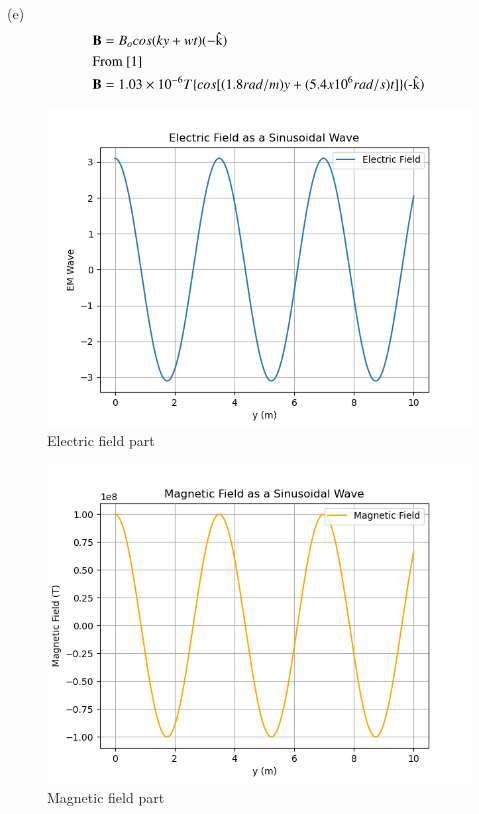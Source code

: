 \documentclass[journal,12pt,twocolumn]{IEEEtran}
\theoremstyle{remark}
\begin{document}
(e)
\begin{align}
	&\textbf{B}=B_ocos(ky+wt)(-\text{\^k})\\
	&\notag\text{From \eqref{1}}\\
	&\textbf{B}=1.03\times10^{-6}T\{cos[(1.8rad/m)y+(5.4x10^{6}rad/s)t]\}(\text{-\^k})
\end{align}
\begin{figure}[h]
\centering
\includegraphics[width=1.25\columnwidth]{Ewave.png}
\caption{Electric field part}
\label{solution}
\end{figure}
\begin{figure}[h]
\centering
\includegraphics[width=1.25\columnwidth]{Mwave.png}
\caption{Magnetic field part}
\label{solution}
\end{figure}
\end{document}
